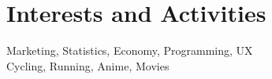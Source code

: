 \documentclass[a4paper,10pt]{article}
\begin{document}
\section{Interests and Activities}
Marketing, Statistics, Economy, Programming, UX\\
Cycling, Running, Anime, Movies\\

\newpage

\end{document}
